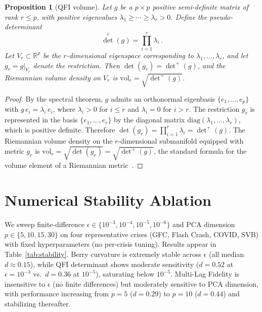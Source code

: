 \documentclass[3p]{elsarticle}
\newtheorem{proposition}[theorem]{Proposition}
\newcommand{\R}{\mathbb{R}}
\begin{document}
\begin{proposition}[QFI volume]\label{prop:qfi_volume}
Let $g$ be a $p \times p$ positive semi-definite matrix of rank
$r \leq p$, with positive eigenvalues
$\lambda_1 \geq \cdots \geq \lambda_r > 0$.  Define the
\emph{pseudo-determinant}
\begin{equation}\label{eq:pseudodet}
  \det^+(g) = \prod_{i=1}^{r} \lambda_i\,.
\end{equation}
Let $V_r \subset \R^p$ be the $r$-dimensional eigenspace corresponding
to $\lambda_1,\ldots,\lambda_r$, and let $g_r = g|_{V_r}$ denote the
restriction.  Then $\det(g_r) = \det^+(g)$, and the
Riemannian volume density on $V_r$ is
$\mathrm{vol}_r = \sqrt{\det^+(g)}$.
\end{proposition}
\begin{proof}
By the spectral theorem, $g$ admits an orthonormal eigenbasis
$\{e_1,\ldots,e_p\}$ with $g\,e_i = \lambda_i\,e_i$, where
$\lambda_i > 0$ for $i \leq r$ and $\lambda_i = 0$ for $i > r$.
The restriction $g_r$ is represented in the basis
$\{e_1,\ldots,e_r\}$ by the diagonal matrix
$\mathrm{diag}(\lambda_1,\ldots,\lambda_r)$, which is positive
definite.  Therefore
$\det(g_r) = \prod_{i=1}^{r}\lambda_i = \det^+(g)$.
The Riemannian volume density on the $r$-dimensional submanifold
equipped with metric $g_r$ is
$\mathrm{vol}_r = \sqrt{\det(g_r)} = \sqrt{\det^+(g)}$,
the standard formula for the volume element of a Riemannian
metric~\cite{amari_nagaoka2000}.
\end{proof}



\section{Numerical Stability Ablation}\label{sec:stability}

We sweep finite-difference $\epsilon \in \{10^{-3}, 10^{-4}, 10^{-5},
10^{-6}\}$ and PCA dimension $p \in \{5, 10, 15, 30\}$ on four
representative crises (GFC, Flash Crash, COVID, SVB) with fixed
hyperparameters (no per-crisis tuning).  Results appear in
Table~\ref{tab:stability}.  Berry curvature is extremely stable
across $\epsilon$ (all median $d \approx 0.15$), while QFI
determinant shows moderate sensitivity ($d = 0.52$ at
$\epsilon = 10^{-3}$ vs.\ $d = 0.36$ at $10^{-5}$), saturating
below $10^{-5}$.  Multi-Lag Fidelity is insensitive to $\epsilon$
(no finite differences) but moderately sensitive to PCA dimension,
with performance increasing from $p = 5$ ($d = 0.29$) to $p = 10$
($d = 0.44$) and stabilizing thereafter.
\end{document}
